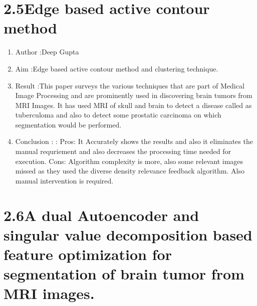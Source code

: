 \documentclass[oneside,a4paper,12pt]{book}
\begin{document}
\newpage
\vspace{\baselineskip}\section*{2.5\hspace*{10pt}Edge based active contour method}
\begin{enumerate}

\item Author :Deep Gupta
\item Aim :Edge based active contour method and clustering technique.
\item Result :This paper surveys the various techniques that are part of Medical Image Processing and are prominently used in discovering brain tumors from MRI Images. It has used MRI of skull and brain to detect a disease called as tuberculoma and also to detect some prostatic carcinoma on which segmentation would be performed.
\item Conclusion :  
: Pros: It Accurately shows the results and also it eliminates the manual requriement and also decreases the processing time needed for execution.
Cons: Algorithm complexity is more, also some relevant images missed as they used the diverse density relevance feedback algorithm. Also manual intervention is required.
\end{enumerate}
\newpage
\vspace{\baselineskip}\section*{2.6\hspace*{10pt}A dual Autoencoder and singular value decomposition based feature optimization for  segmentation of brain tumor from MRI images.
}
\end{document}
